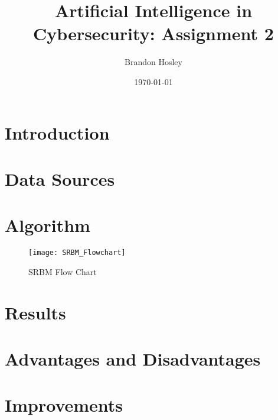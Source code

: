 \documentclass[]{article}
\title{Artificial Intelligence in Cybersecurity: Assignment 2}
\author{Brandon Hosley}
\date{\today}
\begin{document}
	\maketitle
	
\section{Introduction}



\section{Data Sources}



\section{Algorithm}




\begin{figure}[h]
	\centering
	\texttt{[image: SRBM\_Flowchart]}
	\caption{SRBM Flow Chart \cite{Liu2021}}
\end{figure}


\section{Results}



\section{Advantages and Disadvantages}






\section{Improvements}




\clearpage


\end{document}
